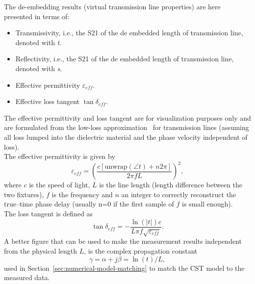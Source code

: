 \documentclass[11pt,a4paper]{article}
\newcommand{\sref}[1]{Section~\ref{#1}}
\begin{document}
    The de-embedding results (virtual transmission line properties) are here presented in terms of:
    \begin{itemize}
        \item Transmissivity, i.e., the S21 of the de embedded length of transmission line, denoted with \emph{t}.
        \item Reflectivity, i.e., the S21 of the de embedded length of transmission line, denoted with \emph{s}.
        \item Effective permittivity $\varepsilon_{eff}$.
        \item Effective loss tangent $\tan\delta_{eff}$.
    \end{itemize}
    The effective permittivity and loss tangent are for visualization purposes only and are formulated from the low-loss
    approximation~\cite{Pozar} for transmission lines (assuming all loss lumped into the dielectric material and
    the phase velocity independent of loss).\\
    The effective permittivity is given by
    \begin{equation}
        \varepsilon_{eff} = \left(\dfrac{ c [\text{unwrap}(\angle{t}) + n2\pi]} {2\pi f L}\right)^2,
        \label{eq:epsilon}
    \end{equation}
    where $c$ is the speed of light, $L$ is the line length (length difference between the two fixtures),
    $f$ is the frequency and $n$ an integer to correctly reconstruct the true--time phase delay
    (usually n=0 if the first sample of $f$ is small enough).\\
    The loss tangent is defined as
    \begin{equation}
        \tan \delta_{eff} = -\dfrac{\ln(|t|) c}{L \pi f \sqrt{\varepsilon_{eff}}}.
        \label{eq:tand}
    \end{equation}
    A better figure that can be used to make the measurement results independent from the physical length $L$, is the
    complex propagation constant
    \begin{equation}
        \gamma = \alpha + j \beta = \ln(t) / L,
        \label{eq:gamma}
    \end{equation}
    used in \sref{sec:numerical-model-matching} to match the CST model to the measured data.\\
\end{document}
